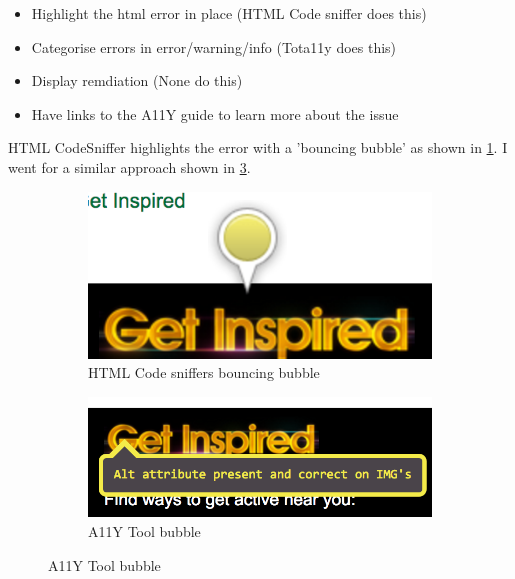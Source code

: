 \begin{itemize}
\item Highlight the html error in place (HTML Code sniffer does this)
\item Categorise errors in error/warning/info (Tota11y does this)
\item Display remdiation (None do this)
\item Have links to the A11Y guide to learn more about the issue
\end{itemize}

HTML CodeSniffer highlights the error with a 'bouncing bubble' as shown in
\ref{fig:codesniffer}. I went for a similar approach shown in
\ref{fig:tool_bubble}.

\begin{figure}[H]
    \centering
    \begin{subfigure}[b]{0.25\textwidth}
        \includegraphics[width=\textwidth]{figures/codesniffer}
        \captionsetup{justification=centering}
        \caption{HTML Code sniffers bouncing bubble}
        \label{fig:codesniffer}
    \end{subfigure}
    \qquad
    \begin{subfigure}[b]{0.4\textwidth}
        \includegraphics[width=\textwidth]{figures/tool_bubble}
        \captionsetup{justification=centering}
        \caption{A11Y Tool bubble}
        \label{fig:tool_bubble}
    \end{subfigure}
\end{figure}

